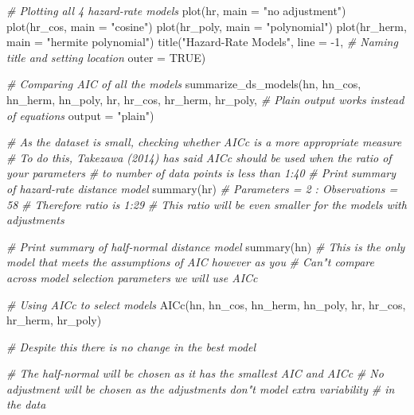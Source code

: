 \documentclass[
  12pt,
]{article}
\newenvironment{Shaded}{\begin{snugshade}}{\end{snugshade}}
\newcommand{\AttributeTok}[1]{\textcolor[rgb]{0.77,0.63,0.00}{#1}}
\newcommand{\CommentTok}[1]{\textcolor[rgb]{0.56,0.35,0.01}{\textit{#1}}}
\newcommand{\ConstantTok}[1]{\textcolor[rgb]{0.00,0.00,0.00}{#1}}
\newcommand{\DecValTok}[1]{\textcolor[rgb]{0.00,0.00,0.81}{#1}}
\newcommand{\FunctionTok}[1]{\textcolor[rgb]{0.00,0.00,0.00}{#1}}
\newcommand{\NormalTok}[1]{#1}
\newcommand{\SpecialCharTok}[1]{\textcolor[rgb]{0.00,0.00,0.00}{#1}}
\newcommand{\StringTok}[1]{\textcolor[rgb]{0.31,0.60,0.02}{#1}}
\begin{document}
\begin{Shaded}
\begin{Highlighting}[]
\CommentTok{\# Plotting all 4 hazard{-}rate models}
\FunctionTok{plot}\NormalTok{(hr, }\AttributeTok{main =} \StringTok{"no adjustment"}\NormalTok{)}
\FunctionTok{plot}\NormalTok{(hr\_cos, }\AttributeTok{main =} \StringTok{"cosine"}\NormalTok{)}
\FunctionTok{plot}\NormalTok{(hr\_poly, }\AttributeTok{main =} \StringTok{"polynomial"}\NormalTok{)}
\FunctionTok{plot}\NormalTok{(hr\_herm, }\AttributeTok{main =} \StringTok{"hermite polynomial"}\NormalTok{)}
\FunctionTok{title}\NormalTok{(}\StringTok{"Hazard{-}Rate Models"}\NormalTok{, }
      \AttributeTok{line =} \SpecialCharTok{{-}}\DecValTok{1}\NormalTok{, }
      \CommentTok{\# Naming title and setting location}
      \AttributeTok{outer =} \ConstantTok{TRUE}\NormalTok{) }

\CommentTok{\# Comparing AIC of all the models }
\FunctionTok{summarize\_ds\_models}\NormalTok{(hn, hn\_cos, hn\_herm, hn\_poly, }
\NormalTok{                    hr, hr\_cos, hr\_herm, hr\_poly,}
                    \CommentTok{\# Plain output works instead of equations}
                    \AttributeTok{output =} \StringTok{"plain"}\NormalTok{) }

\CommentTok{\# As the dataset is small, checking whether AICc is a more appropriate measure}
\CommentTok{\# To do this, Takezawa (2014) has said AICc should be used when the ratio of your parameters}
\CommentTok{\#   to number of data points is less than 1:40}
\CommentTok{\# Print summary of hazard{-}rate distance model}
\FunctionTok{summary}\NormalTok{(hr)}
  \CommentTok{\# Parameters = 2 : Observations = 58}
  \CommentTok{\# Therefore ratio is 1:29}
  \CommentTok{\#   This ratio will be even smaller for the models with adjustments }

\CommentTok{\# Print summary of half{-}normal distance model}
\FunctionTok{summary}\NormalTok{(hn)}
  \CommentTok{\# This is the only model that meets the assumptions of AIC however as you }
  \CommentTok{\#   Can"t compare across model selection parameters we will use AICc}

\CommentTok{\# Using AICc to select models }
\FunctionTok{AICc}\NormalTok{(hn, hn\_cos, hn\_herm, hn\_poly, }
\NormalTok{     hr, hr\_cos, hr\_herm, hr\_poly)}

\CommentTok{\# Despite this there is no change in the best model}

\CommentTok{\# The half{-}normal will be chosen as it has the smallest AIC and AICc}
\CommentTok{\# No adjustment will be chosen as the adjustments don"t model extra variability }
\CommentTok{\#   in the data }
\end{Highlighting}
\end{Shaded}
\end{document}
